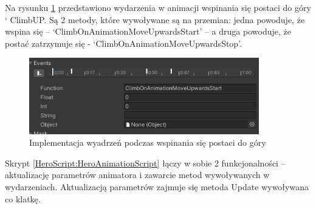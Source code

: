 \documentclass[12pt,twoside]{article}
\begin{document}
Na rysunku \ref{Hero:AnimEvent:ClimbOnAnimationUpwards} przedstawiono wydarzenia
w animacji wspinania się postaci do góry ` ClimbUP. Są 2 metody, które
wywoływane są na przemian: jedna powoduje, że wspina się –
‘ClimbOnAnimationMoveUpwardsStart’ -- a druga powoduje, że postać zatrzymuje się
- ‘ClimbOnAnimationMoveUpwardsStop’. 

\begin{figure}[ht]
    \centering
	\includegraphics[width=10cm]{RealizacjaProjektu/UnityPictires/Animator/Player1_ClimbOnAnimationUpwards.jpg}
	\caption{Implementacja wyadrzeń podczas wspinania się postaci do góry}
    \label{Hero:AnimEvent:ClimbOnAnimationUpwards}
\end{figure}

Skrypt \ref{HeroScript:HeroAnimationScript} łączy w sobie 2 funkcjonalności -- aktualizację
parametrów animatora i zawarcie metod wywoływanych w wydarzeniach. Aktualizacją
parametrów zajmuje się metoda Update wywoływana co klatkę. 
\end{document}
